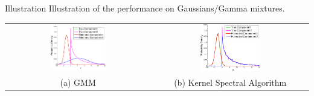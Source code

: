 \documentclass[final,t]{beamer}
\begin{document}
\begin{frame}{}
\begin{columns}[T]
\begin{column}{.3\linewidth}
    \begin{block}{Illustration}
    Illustration of the performance on Gaussians/Gamma mixtures.
    \begin{center}
        \begin{tabular}{cc}
        \includegraphics[width=0.4\textwidth]{../experiment/visualization/em_visual_k_2_view_1-crop}&
        \includegraphics[width=0.4\textwidth]{../experiment/visualization/visual_k_2_view_1-crop-crop}\\
        (a) GMM & (b) Kernel Spectral Algorithm
        \end{tabular}
    \end{center}
    \vspace{-0.45in}
    \end{block}
    
    \end{column}


\end{columns}
\end{frame}
\end{document}

